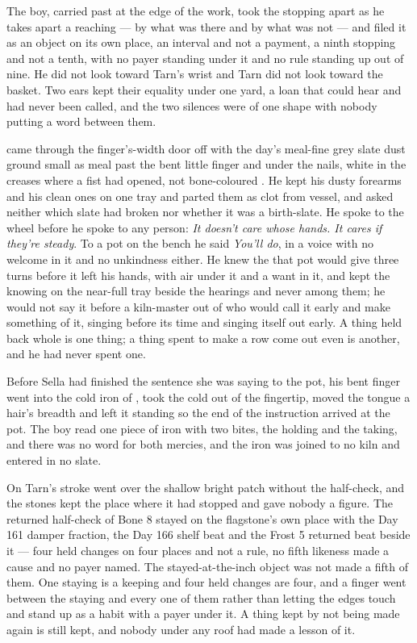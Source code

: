 The boy, carried past at the edge of the work, took the stopping apart as he takes apart a reaching --- by what was there and by what was not --- and filed it as an object on its own place, an interval and not a payment, a ninth stopping and not a tenth, with no payer standing under it and no rule standing up out of nine. He did not look toward Tarn's wrist and Tarn did not look toward the basket. Two ears kept their equality under one yard, a loan that could hear and had never been called, and the two silences were of one shape with nobody putting a word between them.

\scenebreak

 came through the finger's-width door off  with the day's meal-fine grey slate dust ground small as meal past the bent little finger and under the nails, white in the creases where a fist had opened, not bone-coloured . He kept his dusty forearms and his clean ones on one tray and parted them as clot from vessel, and asked neither which slate had broken nor whether it was a birth-slate. He spoke to the wheel before he spoke to any person: \emph{It doesn't care whose hands. It cares if they're steady}. To a pot on the bench he said \emph{You'll do}, in a voice with no welcome in it and no unkindness either. He knew the  that pot would give three turns before it left his hands, with air under it and a want in it, and kept the knowing on the near-full tray beside the hearings and never among them; he would not say it before a kiln-master out of  who would call it early and make something of it, singing before its time and singing itself out early. A thing held back whole is one thing; a thing spent to make a row come out even is another, and he had never spent one.

Before Sella had finished the sentence she was saying to the pot, his bent finger went into the cold iron of , took the cold out of the fingertip, moved the tongue a hair's breadth and left it standing so the end of the instruction arrived at the pot. The boy read one piece of iron with two bites, the holding and the taking, and there was no  word for both mercies, and the iron was joined to no kiln and entered in no slate.

On  Tarn's stroke went over the shallow bright patch without the half-check, and the stones kept the place where it had stopped and gave nobody a figure. The returned half-check of Bone 8 stayed on the flagstone's own place with the Day 161 damper fraction, the Day 166 shelf beat and the Frost 5 returned beat beside it --- four held changes on four places and not a rule, no fifth likeness made a cause and no payer named. The stayed-at-the-inch object was not made a fifth of them. One staying is a keeping and four held changes are four, and a finger went between the staying and every one of them rather than letting the edges touch and stand up as a habit with a payer under it. A thing kept by not being made again is still kept, and nobody under any roof had made a lesson of it.

